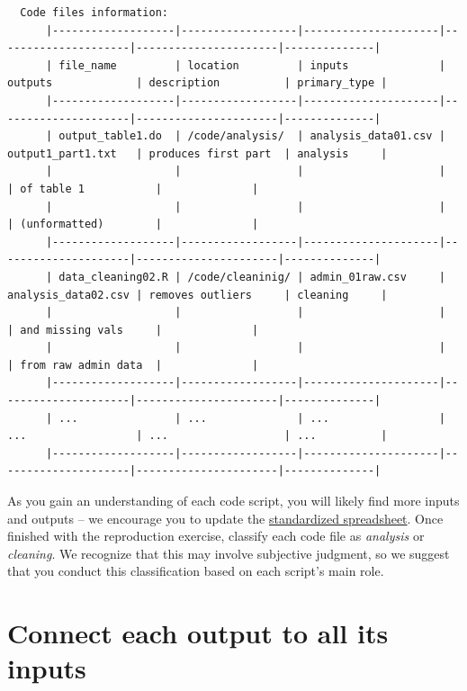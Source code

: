 \documentclass[]{book}
\begin{document}
\begin{verbatim}
  Code files information:
      |-------------------|------------------|---------------------|---------------------|----------------------|--------------|
      | file_name         | location         | inputs              | outputs             | description          | primary_type |
      |-------------------|------------------|---------------------|---------------------|----------------------|--------------|
      | output_table1.do  | /code/analysis/  | analysis_data01.csv | output1_part1.txt   | produces first part  | analysis     |
      |                   |                  |                     |                     | of table 1           |              |
      |                   |                  |                     |                     | (unformatted)        |              |
      |-------------------|------------------|---------------------|---------------------|----------------------|--------------|
      | data_cleaning02.R | /code/cleaninig/ | admin_01raw.csv     | analysis_data02.csv | removes outliers     | cleaning     |
      |                   |                  |                     |                     | and missing vals     |              |
      |                   |                  |                     |                     | from raw admin data  |              |
      |-------------------|------------------|---------------------|---------------------|----------------------|--------------|
      | ...               | ...              | ...                 | ...                 | ...                  | ...          |
      |-------------------|------------------|---------------------|---------------------|----------------------|--------------|
\end{verbatim}

As you gain an understanding of each code script, you will likely find more inputs and outputs -- we encourage you to update the \href{https://docs.google.com/spreadsheets/d/1LUIdVFH0OfR70C7z07TYeE-uWzKI_JIeWUMaYhqEKK0/edit\#gid=1617799822\&range=A1}{standardized spreadsheet}. Once finished with the reproduction exercise, classify each code file as \emph{analysis} or \emph{cleaning}. We recognize that this may involve subjective judgment, so we suggest that you conduct this classification based on each script's main role.

\hypertarget{diagram}{%
\section{Connect each output to all its inputs}\label{diagram}}
\end{document}
